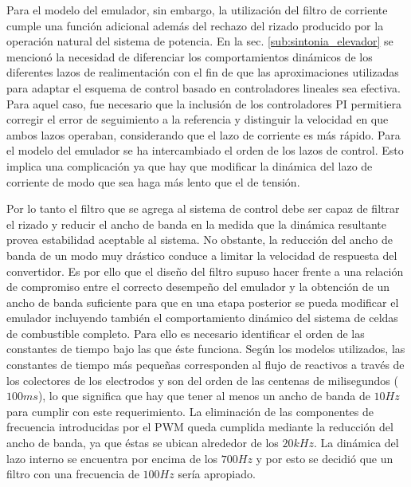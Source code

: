 Para el modelo del emulador, sin embargo, la utilización del filtro de corriente cumple una función adicional además del rechazo del rizado producido por
la operación natural del sistema de potencia. En la sec. \ref{sub:sintonia_elevador} se mencionó la necesidad de diferenciar los comportamientos dinámicos
de los diferentes lazos de realimentación con el fin de que las aproximaciones utilizadas para adaptar el esquema de control basado en controladores lineales
sea efectiva. Para aquel caso, fue necesario que la inclusión de los controladores PI permitiera corregir el error de seguimiento a la referencia y distinguir
la velocidad en que ambos lazos operaban, considerando que el lazo de corriente es más rápido. Para el modelo del emulador se ha intercambiado el orden de los
lazos de control. Esto implica una complicación ya que hay que modificar la dinámica del lazo de corriente de modo que sea haga más lento que el de tensión.

Por lo tanto el filtro que se agrega al sistema de control debe ser capaz de filtrar el rizado y reducir el ancho de banda en la medida que la dinámica resultante
provea estabilidad aceptable al sistema. No obstante, la reducción del ancho de banda de un modo muy drástico conduce a limitar la velocidad de respuesta
del convertidor. Es por ello que el diseño del filtro supuso hacer frente a una relación de compromiso entre el correcto desempeño
del emulador y la obtención de un ancho de banda suficiente para que en una etapa posterior se pueda modificar el emulador incluyendo también el comportamiento dinámico
del sistema de celdas de combustible completo. Para ello es necesario identificar el orden de las constantes de tiempo bajo las que éste funciona. Según los modelos 
utilizados, las constantes de tiempo más pequeñas corresponden al flujo de reactivos a través de los colectores de los electrodos y son del orden de las centenas de 
milisegundos ($100ms$), lo que significa que hay que tener al menos un ancho de banda de $10Hz$ para cumplir con este requerimiento. La eliminación de las componentes
de frecuencia introducidas por el PWM queda cumplida mediante la reducción del ancho de banda, ya que éstas se ubican alrededor de los $20kHz$. La dinámica del lazo
interno se encuentra por encima de los $700Hz$ y por esto se decidió que un filtro con una frecuencia de $100Hz$ sería apropiado.

